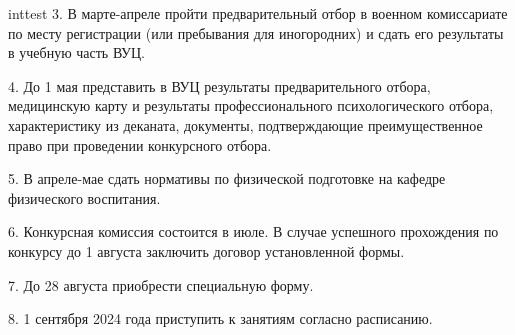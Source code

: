 \begin{longtbl}{inttest}
3. В марте-апреле пройти предварительный отбор в военном комиссариате по месту регистрации (или пребывания для иногородних) и сдать его результаты в учебную часть ВУЦ.

4. До 1 мая представить в ВУЦ результаты предварительного отбора, медицинскую карту и результаты профессионального психологического отбора, характеристику из деканата, документы, подтверждающие преимущественное право при проведении конкурсного отбора.

5. В апреле-мае сдать нормативы по физической подготовке на кафедре физического воспитания.

6. Конкурсная комиссия состоится в июле. В случае успешного прохождения по конкурсу до 1 августа заключить договор установленной формы.

7. До 28 августа приобрести специальную форму.

8. 1 сентября 2024 года приступить к занятиям согласно расписанию.


\end{longtbl}
